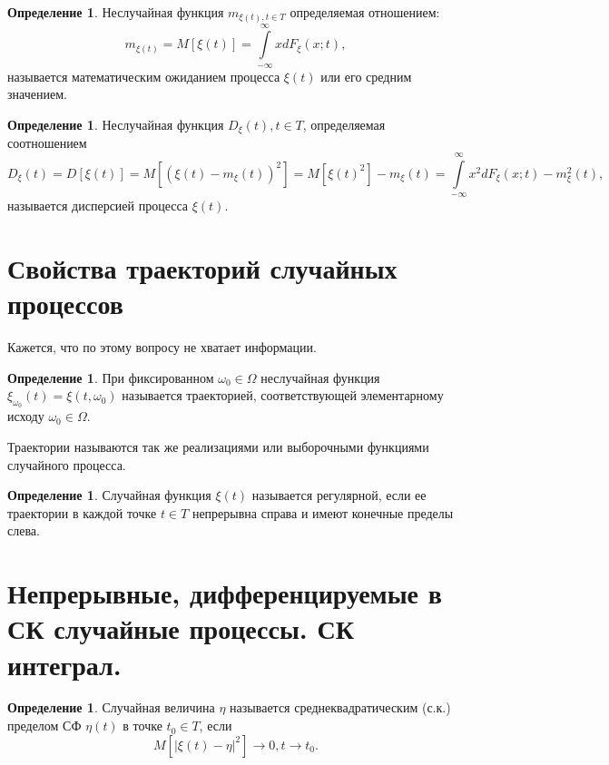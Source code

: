 \documentclass[12pt]{report}
\theoremstyle{definition}
\newtheorem{definition}[theorem]{Определение}
\begin{document}
\begin{definition}
Неслучайная функция $m_{\xi(t), t \in T}$ определяемая отношением:
$$
m_{\xi(t)} = M[\xi(t)] = \int\limits_{-\infty}^{\infty} x d F_\xi(x; t),
$$
называется математическим ожиданием процесса $\xi(t)$ или его средним
значением.
\end{definition}

\begin{definition}
Неслучайная функция $D_\xi(t), t \in T$, определяемая соотношением
$$
D_\xi(t) = D[\xi(t)] = M[(\xi(t) - m_\xi(t))^2] =
M[\xi(t)^2] - m_\xi(t) =
\int\limits_{-\infty}^{\infty} x^2 d F_\xi(x; t) - m^2_\xi(t),
$$
называется дисперсией процесса $\xi(t)$.
\end{definition}


\section{Свойства траекторий случайных процессов}
Кажется, что по этому вопросу не хватает информации.

\begin{definition}
При фиксированном $\omega_0 \in \Omega$ неслучайная функция
$\xi_{\omega_0}(t) = \xi(t, \omega_0)$ называется траекторией,
соответствующей элементарному исходу $\omega_0 \in \Omega$.

Траектории называются так же реализациями или выборочными функциями
случайного процесса.
\end{definition}

\begin{definition}
Случайная функция $\xi(t)$ называется регулярной, если ее
траектории в каждой точке $t \in T$ непрерывна справа и имеют
конечные пределы слева.
\end{definition}



\section
{
  Непрерывные, дифференцируемые в СК случайные процессы.
  СК интеграл.
}

\begin{definition}
Случайная величина $\eta$ называется среднеквадратическим (с.к.)
пределом СФ $\eta(t)$ в точке $t_0 \in T$, если
$$
M[|\xi(t) - \eta|^2] \rightarrow 0, t \rightarrow t_0.
$$
\end{definition}
\end{document}
